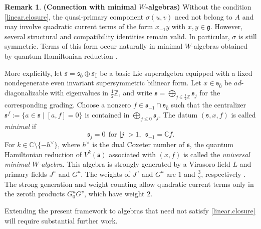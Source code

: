 \documentclass[12pt]{article}
\numberwithin{equation}{section}
\theoremstyle{definition}
\newtheorem{remark}[theorem]{Remark}
\theoremstyle{plain}
\newcommand{\bC}{\ensuremath{\mathbb{C}}}
\newcommand{\bZ}{\ensuremath{\mathbb{Z}}}
\newcommand{\ep}{\ensuremath{{\bar{0}}}}
\newcommand{\op}{\ensuremath{{\bar{1}}}}
\newcommand{\fg}{\mathfrak{g}}
\newcommand{\fs}{\mathfrak{s}}
\begin{document}
\begin{remark}\label{rmk:linear.closure}\textbf{(Connection with minimal $W$-algebras)}
Without the condition \eqref{linear.closure}, the quasi-primary component $\sigma(u,v)$ need not belong to $A$ and may involve quadratic current terms of the form $x_{-1}y$ with $x,y\in\fg$. However, several structural and compatibility identities remain valid. In particular, $\sigma$ is still symmetric. Terms of this form occur naturally in minimal $W$-algebras obtained by quantum Hamiltonian reduction \cite{KRW,KW}. 

More explicitly, let $\fs=\fs_\ep\oplus\fs_\op$ be a basic Lie superalgebra equipped with a fixed nondegenerate even invariant supersymmetric bilinear form. Let $x\in\fs_\ep$ be $ad$-diagonalizable with eigenvalues in $\frac12\bZ$, and write $\fs=\bigoplus_{j\in\frac12\bZ}\fs_j$ for the corresponding grading. Choose a nonzero $f\in\fs_{-1}\cap\fs_\ep$ such that the centralizer $\fs^f:=\{a\in\fs\mid[a,f]=0\}$ is contained in $\bigoplus_{j\leq0}\fs_j$. The datum $(\fs,x,f)$ is called \emph{minimal} if
\begin{equation*}
    \fs_j=0\ \ \text{for }|j|>1,\ \  \fs_{-1}=\bC f.
\end{equation*}
For $k\in\bC\setminus\{-h^\vee\}$, where $h^\vee$ is the dual Coxeter number of $\fs$, the quantum Hamiltonian reduction of $V^k(\fs)$ associated with $(x,f)$ is called the \emph{universal minimal $W$-algebra}. This algebra is strongly generated by a Virasoro field $L$ and primary fields $J^a$ and $G^u$. The weights of $J^a$ and $G^u$ are $1$ and $\frac32$, respectively \cite{KW}. The strong generation and weight counting allow quadratic current terms only in the zeroth products $G^u_0G^v$, which have weight $2$. 

Extending the present framework to algebras that need not satisfy
\eqref{linear.closure} will require substantial further work.
\end{remark}
\end{document}
